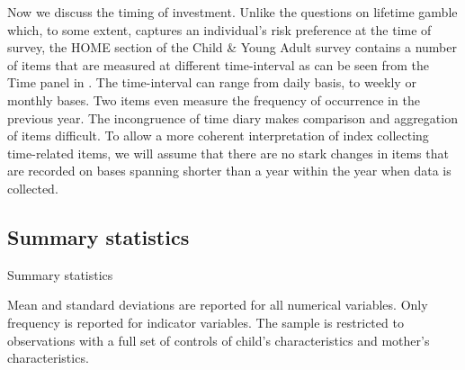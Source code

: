 \documentclass[emulatestandardclasses, 10pt, abstract = true]{scrartcl}
\begin{document}
Now we discuss the timing of investment. Unlike the questions on lifetime gamble which, to some extent, captures an individual's risk preference at the time of survey, the HOME section of the Child \& Young Adult survey contains a number of items that are measured at different time-interval as can be seen from the Time panel in . The time-interval can range from daily basis, to weekly or monthly bases. Two items even measure the frequency of occurrence in the previous year. The incongruence of time diary makes comparison and aggregation of items difficult. To allow a more coherent interpretation of index collecting time-related items, we will assume that there are no stark changes in items that are recorded on bases spanning shorter than a year within the year when data is collected.


\subsection{Summary statistics}

\begin{table}[!b]\centering \caption{Summary statistics \label{table:summary}}
	\setlength{\extrarowheight}{0.3em}
	\begin{threeparttable}
		
	\begin{tablenotes}[flushleft]\footnotesize
		\item Mean and standard deviations are reported for all numerical variables. Only frequency is reported for indicator variables. The sample is restricted to observations with a full set of controls of child's characteristics and mother's characteristics.
	\end{tablenotes}
	\end{threeparttable}
\end{table}
\end{document}

